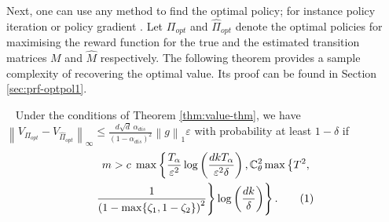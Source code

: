 \documentclass[opre,sglanonrev]{informs4}
\newcommand{\harsha}[1]{\textcolor{red}{[Harsha: #1]}}
\numberwithin{equation}{section}
\newcommand{\pow}[1]{^{(#1)}}
\newcommand{\lp}{\left(}
\newcommand{\rp}{\right)}
\newcommand{\lc}{\left\{}
\newcommand{\rc}{\right\}}
\newcommand{\lb}{\left[}
\newcommand{\rb}{\right]}
\newcommand{\lV}{\left\|}
\newcommand{\rV}{\right\|}
\newcommand{\ldot}{\left.}
\newcommand{\rdot}{\right.}
\newcommand{\Cbb}{\mathbb{C}}
\newcommand{\constant}{\Cbb}
\newcommand\numberthis{\addtocounter{equation}{1}\tag{\theequation}}
\newcommand{\eps}{\varepsilon}
\renewcommand{\epsilon}{\eps}
\begin{document}
{%


{
{
Next, one can use any method to find the optimal policy; for instance policy iteration \citep[Chapter 1]{bertsekas2011dynamic} or policy gradient \citep[Chapter 13]{sutton2018reinforcement}. Let $\Pi_{opt}$ and $\hat \Pi_{opt}$ denote the optimal policies for maximising the reward function for the true and the estimated transition matrices $M$ and $\hat M$ respectively. The following theorem provides a sample complexity of recovering the optimal value. Its proof can be found in Section \ref{sec:prf-optpol1}.

\begin{theorem}~\label{thm:opt-pol1}
 Under the conditions of Theorem \ref{thm:value-thm}, we have  $\lV V_{\Pi_{opt}} -  V_{\hat \Pi_{opt}}\rV_\infty\leq\frac{d\sqrt{d}\ \alpha_{dis}}{(1-\alpha_{dis})^2} \lV g\rV_{1}\eps
    $ with probability at least $1-\delta$ if
    \begin{align*}
         m>c \; \max\left\{\frac{T_\alpha}{\eps^2}\log\lp\frac{dkT_\alpha}{\epsilon^2\delta} \rp, \constant_\theta^2\max\lc {T}^2, \rdot\rdot\\\ldot
         \ldot\frac{1}{\lp 1-\max\{\zeta_1,1-\zeta_2\}\rp^2}\rc \log\lp \frac{dk}{\delta} \rp\right\}.\numberthis\label{eq:optpol-eq1}
    \end{align*}
\end{theorem}

}}}
\end{document}
